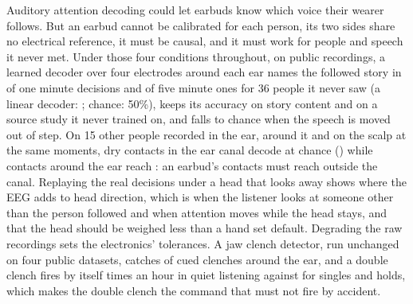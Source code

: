 Auditory attention decoding could let earbuds know which voice their wearer follows. But an earbud cannot be calibrated for each person, its two sides share no electrical reference, it must be causal, and it must work for people and speech it never met. Under those four conditions throughout, on public recordings, a learned decoder over four electrodes around each ear names the followed story in \nnSixty{} of one minute decisions and \nnFiveMin{} of five minute ones for 36 people it never saw (a linear decoder: \linSixty{}; chance: 50\%), keeps its accuracy on story content and on a source study it never trained on, and falls to chance when the speech is moved out of step. On 15 other people recorded in the ear, around it and on the scalp at the same moments, dry contacts in the ear canal decode at chance (\earInNn{}) while contacts around the ear reach \earAroundNn{}: an earbud's contacts must reach outside the canal. Replaying the real decisions under a head that looks away shows where the EEG adds to head direction, which is when the listener looks at someone other than the person followed and when attention moves while the head stays, and that the head should be weighed less than a hand set default. Degrading the raw recordings sets the electronics' tolerances. A jaw clench detector, run unchanged on four public datasets, catches \clAround{} of cued clenches around the ear, and a double clench fires by itself \clListenDouble{} times an hour in quiet listening against \clListenOthers{} for singles and holds, which makes the double clench the command that must not fire by accident.
